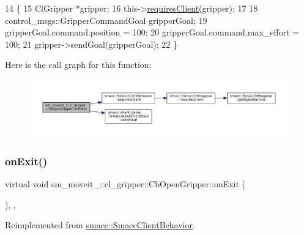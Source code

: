 \begin{DoxyCode}
14     \{
15         ClGripper *gripper;
16         this->\hyperlink{classsmacc_1_1SmaccClientBehavior_a917f001e763a1059af337bf4e164f542}{requiresClient}(gripper);
17 
18         control\_msgs::GripperCommandGoal gripperGoal;
19         gripperGoal.command.position = 100;
20         gripperGoal.command.max\_effort = 100;
21         gripper->sendGoal(gripperGoal);
22     \}
\end{DoxyCode}
Here is the call graph for this function\+:
\nopagebreak
\begin{figure}[H]
\begin{center}
\leavevmode
\includegraphics[width=350pt]{classsm__moveit__2_1_1cl__gripper_1_1CbOpenGripper_aaa18f60580c10e891b572f61f85ffb05_cgraph}
\end{center}
\end{figure}
\mbox{\label{classsm__moveit__2_1_1cl__gripper_1_1CbOpenGripper_ab72fa9429628aa78b2bb1276ff7d390a}} 
\subsubsection{\texorpdfstring{on\+Exit()}{onExit()}}
{\footnotesize\ttfamily virtual void sm\+\_\+moveit\+\_\+::cl\+\_\+gripper\+::\+Cb\+Open\+Gripper\+::on\+Exit (\begin{DoxyParamCaption}{ }\end{DoxyParamCaption})\hspace{0.3cm}{\ttfamily [inline]}, {\ttfamily [override]}, {\ttfamily [virtual]}}



Reimplemented from \hyperlink{classsmacc_1_1SmaccClientBehavior_ac0cd72d42bd00425362a97c9803ecce5}{smacc\+::\+Smacc\+Client\+Behavior}.



